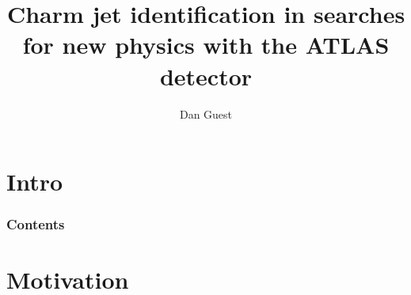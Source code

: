 \documentclass[usenames,dvipsnames]{beamer}
\title[Charmed SUSY]{Charm jet identification in searches for new physics with the ATLAS detector}
\author[dhg3]{Dan Guest}
\institute[Yale]{Yale University}
\begin{document}
\section*{Intro}

\maketitle
\begin{frame}
  \frametitle{Contents}
  \tableofcontents
\end{frame}


\section{Motivation}
\end{document}
